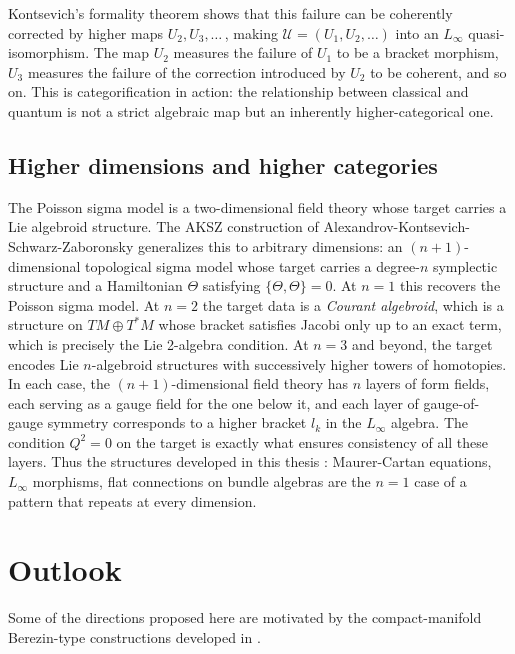 \documentclass[
  12pt,
  a4paper, oneside
]{report}
\theoremstyle{bolddef}
\theoremstyle{remark}
\numberwithin{equation}{chapter}
\begin{document}
Kontsevich's formality theorem shows that this failure can be coherently corrected by higher maps $U_2, U_3, \ldots$\,, making $\mathcal{U} = (U_1, U_2, \ldots)$ into an $L_\infty$ quasi-isomorphism. The map $U_2$ measures the failure of $U_1$ to be a bracket morphism, $U_3$ measures the failure of the correction introduced by $U_2$ to be coherent, and so on. This is categorification in action: the relationship between classical and quantum is not a strict algebraic map but an inherently higher-categorical one.

\subsection*{Higher dimensions and higher categories}

The Poisson sigma model is a two-dimensional field theory whose target carries a Lie algebroid structure. The AKSZ construction of Alexandrov-Kontsevich-Schwarz-Zaboronsky \cite{AKSZ} generalizes this to arbitrary dimensions: an $(n+1)$-dimensional topological sigma model whose target carries a degree-$n$ symplectic structure and a Hamiltonian $\Theta$ satisfying $\{\Theta, \Theta\} = 0$. At $n = 1$ this recovers the Poisson sigma model. At $n = 2$ the target data is a \textit{Courant algebroid}, which is a structure on $TM \oplus T^*M$ whose bracket satisfies Jacobi only up to an exact term, which is precisely the Lie 2-algebra condition. At $n = 3$ and beyond, the target encodes Lie $n$-algebroid structures with successively higher towers of homotopies. In each case, the $(n+1)$-dimensional field theory has $n$ layers of form fields, each serving as a gauge field for the one below it, and each layer of gauge-of-gauge symmetry corresponds to a higher bracket $l_k$ in the $L_\infty$ algebra. The condition $Q^2 = 0$ on the target is exactly what ensures consistency of all these layers. Thus %
the structures developed in this thesis : Maurer-Cartan equations, $L_\infty$ morphisms, flat connections on bundle algebras are the $n = 1$ case of a pattern that repeats at every dimension.


\section{Outlook}
Some of the directions proposed here are motivated by the compact-manifold Berezin-type constructions developed in \cite{dey_berezin_even_2023,dey_rkhs_berezin_odzijewicz}.
\end{document}
